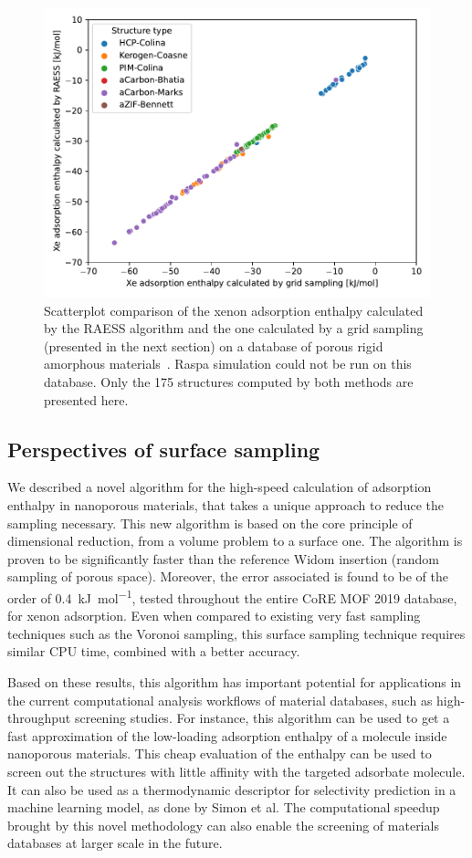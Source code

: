 \documentclass[main]{subfiles}
\begin{document}
\begin{figure}[ht]
  \centering
  \includegraphics[width=0.5\linewidth]{figures/3-fastsim/amorphous_enthalpy.pdf}
  \caption{Scatterplot comparison of the xenon adsorption enthalpy calculated by the RAESS algorithm and the one calculated by a grid sampling (presented in the next section) on a database of porous rigid amorphous materials~\autocite{Thyagarajan_2020}. Raspa simulation could not be run on this database. Only the 175 structures computed by both methods are presented here. }\label{fgr:amorphous}
\end{figure}

\subsection{Perspectives of surface sampling}

We described a novel algorithm for the high-speed calculation of adsorption enthalpy in nanoporous materials, that takes a unique approach to reduce the sampling necessary. This new algorithm is based on the core principle of dimensional reduction, from a volume problem to a surface one. The algorithm is proven to be significantly faster than the reference Widom insertion (random sampling of porous space). Moreover, the error associated is found to be of the order of \SI{0.4}{\kilo\joule\per\mole}, tested throughout the entire CoRE MOF 2019 database, for xenon adsorption. Even when compared to existing very fast sampling techniques such as the Voronoi sampling, this surface sampling technique requires similar CPU time, combined with a better accuracy. 

Based on these results, this algorithm has important potential for applications in the current computational analysis workflows of material databases, such as high-throughput screening studies. For instance, this algorithm can be used to get a fast approximation of the low-loading adsorption enthalpy of a molecule inside nanoporous materials. This cheap evaluation of the enthalpy can be used to screen out the structures with little affinity with the targeted adsorbate molecule. It can also be used as a thermodynamic descriptor for selectivity prediction in a machine learning model, as done by Simon et al.\autocite{Simon_2015} The computational speedup brought by this novel methodology can also enable the screening of materials databases at larger scale in the future.
\end{document}
